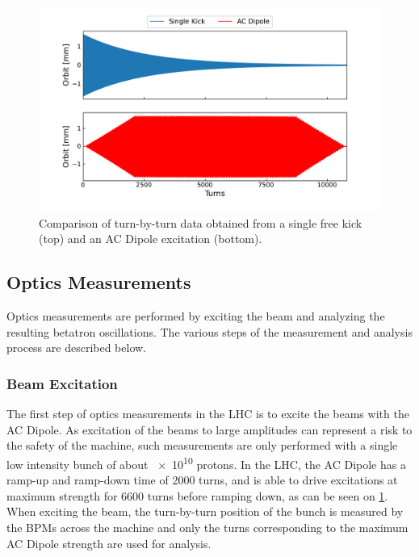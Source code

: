 \begin{figure}[!htb]
  \centering
  \includegraphics*[width=0.99\linewidth]{Figures/Optics_Measurements_Corrections_at_LHC/kick_vs_acdipole.pdf}
  \caption{Comparison of turn-by-turn data obtained from a single free kick (top) and an AC Dipole excitation (bottom).}
  \label{figure:kick_vs_acdipole_tbt}
\end{figure}

\subsection{Optics Measurements}
\label{subsection:optics_measurements}

Optics measurements are performed by exciting the beam and analyzing the resulting betatron oscillations.
The various steps of the measurement and analysis process are described below.

\subsubsection*{Beam Excitation}

The first step of optics measurements in the LHC is to excite the beams with the AC Dipole.
As excitation of the beams to large amplitudes can represent a risk to the safety of the machine, such measurements are only performed with a single low intensity bunch of about \num{e10} protons.
In the LHC, the AC Dipole has a ramp-up and ramp-down time of \num{2000} turns, and is able to drive excitations at maximum strength for \num{6600} turns before ramping down, as can be seen on \cref{figure:kick_vs_acdipole_tbt}.
When exciting the beam, the turn-by-turn position of the bunch is measured by the BPMs across the machine and only the turns corresponding to the maximum AC Dipole strength are used for analysis.

